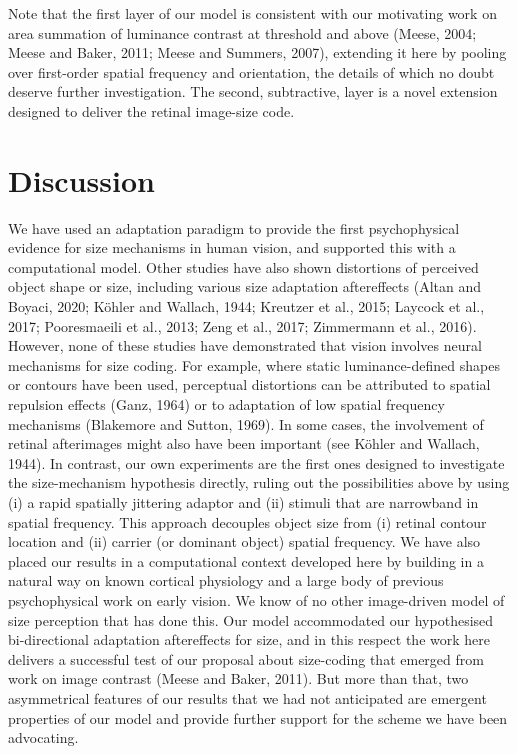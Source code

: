 \documentclass[
]{article}
\begin{document}
Note that the first layer of our model is consistent with our motivating work on area summation of luminance contrast at threshold and above (Meese, 2004; Meese and Baker, 2011; Meese and Summers, 2007), extending it here by pooling over first-order spatial frequency and orientation, the details of which no doubt deserve further investigation. The second, subtractive, layer is a novel extension designed to deliver the retinal image-size code.

\hypertarget{discussion}{%
\section*{Discussion}\label{discussion}}

We have used an adaptation paradigm to provide the first psychophysical evidence for size mechanisms in human vision, and supported this with a computational model. Other studies have also shown distortions of perceived object shape or size, including various size adaptation aftereffects (Altan and Boyaci, 2020; Köhler and Wallach, 1944; Kreutzer et al., 2015; Laycock et al., 2017; Pooresmaeili et al., 2013; Zeng et al., 2017; Zimmermann et al., 2016). However, none of these studies have demonstrated that vision involves neural mechanisms for size coding. For example, where static luminance-defined shapes or contours have been used, perceptual distortions can be attributed to spatial repulsion effects (Ganz, 1964) or to adaptation of low spatial frequency mechanisms (Blakemore and Sutton, 1969). In some cases, the involvement of retinal afterimages might also have been important (see Köhler and Wallach, 1944). In contrast, our own experiments are the first ones designed to investigate the size-mechanism hypothesis directly, ruling out the possibilities above by using (i) a rapid spatially jittering adaptor and (ii) stimuli that are narrowband in spatial frequency. This approach decouples object size from (i) retinal contour location and (ii) carrier (or dominant object) spatial frequency. We have also placed our results in a computational context developed here by building in a natural way on known cortical physiology and a large body of previous psychophysical work on early vision. We know of no other image-driven model of size perception that has done this. Our model accommodated our hypothesised bi-directional adaptation aftereffects for size, and in this respect the work here delivers a successful test of our proposal about size-coding that emerged from work on image contrast (Meese and Baker, 2011). But more than that, two asymmetrical features of our results that we had not anticipated are emergent properties of our model and provide further support for the scheme we have been advocating.
\end{document}
